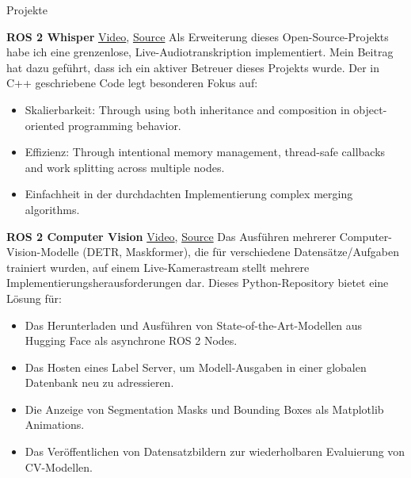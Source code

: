 \begin{rubric}{Projekte}

\entry*[2024] \textbf{ROS 2 Whisper} \hfill \href{https://github.com/ros-ai/ros2_whisper/blob/main/doc/harry_potter_sample.gif}{Video}, \href{https://github.com/ros-ai/ros2_whisper}{\faGithub Source} \newline  
Als Erweiterung dieses Open-Source-Projekts habe ich eine grenzenlose, Live-Audiotranskription implementiert. Mein Beitrag hat dazu geführt, dass ich ein aktiver Betreuer dieses Projekts wurde. Der in C++ geschriebene Code legt besonderen Fokus auf: \newline  
\vspace{\CVItemizeHeaderSpacing} \begin{itemize}  
	\setlength{\itemsep}{\CVItemizeSpacing}  
	\item Skalierbarkeit:  Through using both inheritance and composition in object-oriented programming behavior.
	\item Effizienz:  Through intentional memory management, thread-safe callbacks and work splitting across multiple nodes.
	\item Einfachheit in der durchdachten Implementierung complex merging algorithms.
\end{itemize}  

\entry*[2024] \textbf{ROS 2 Computer Vision} \hfill \href{https://github.com/NathanCorral/ROS-HF-Vision/blob/main/doc/gifs/ex_german_roads.gif}{Video}, \href{https://github.com/NathanCorral/ROS-HF-Vision/tree/main}{\faGithub Source} \newline  
Das Ausführen mehrerer Computer-Vision-Modelle (DETR, Maskformer), die für verschiedene Datensätze/Aufgaben trainiert wurden, auf einem Live-Kamerastream stellt mehrere Implementierungsherausforderungen dar. Dieses Python-Repository bietet eine Lösung für: \newline  
\vspace{\CVItemizeHeaderSpacing} \begin{itemize}  
	\setlength{\itemsep}{\CVItemizeSpacing}  
	\item Das Herunterladen und Ausführen von State-of-the-Art-Modellen aus Hugging Face als asynchrone ROS 2 Nodes.  
	\item Das Hosten eines Label Server, um Modell-Ausgaben in einer globalen Datenbank neu zu adressieren.  
	\item Die Anzeige von Segmentation Masks und Bounding Boxes als Matplotlib Animations.  
	\item Das Veröffentlichen von Datensatzbildern zur wiederholbaren Evaluierung von CV-Modellen.  
\end{itemize}  


\end{rubric}
